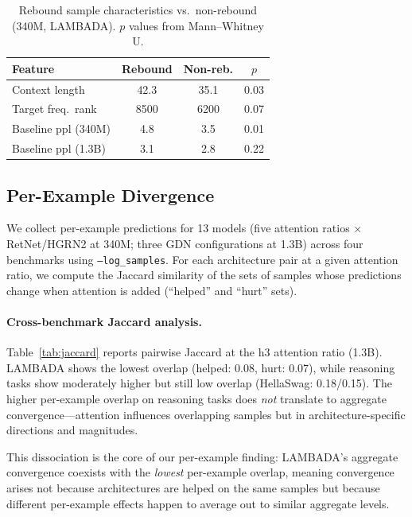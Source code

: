 \documentclass[11pt,twocolumn]{article}
\begin{document}
\begin{table}[t]
\centering
\small
\caption{Rebound sample characteristics vs.\ non-rebound (340M, LAMBADA). $p$ values from Mann--Whitney U.}\label{tab:rebound-chars}
\begin{tabular}{@{}lccc@{}}
\toprule
\textbf{Feature} & \textbf{Rebound} & \textbf{Non-reb.} & \textbf{$p$} \\
\midrule
Context length & 42.3 & 35.1 & 0.03 \\
Target freq.\ rank & 8500 & 6200 & 0.07 \\
Baseline ppl (340M) & 4.8 & 3.5 & 0.01 \\
Baseline ppl (1.3B) & 3.1 & 2.8 & 0.22 \\
\bottomrule
\end{tabular}
\end{table}


\subsection{Per-Example Divergence}\label{sec:per-example}

We collect per-example predictions for 13 models (five attention ratios $\times$ RetNet/HGRN2 at 340M; three GDN configurations at 1.3B) across four benchmarks using \texttt{--log\_samples}.
For each architecture pair at a given attention ratio, we compute the Jaccard similarity of the sets of samples whose predictions change when attention is added (``helped'' and ``hurt'' sets).

\paragraph{Cross-benchmark Jaccard analysis.}
Table~\ref{tab:jaccard} reports pairwise Jaccard at the h3 attention ratio (1.3B).
LAMBADA shows the lowest overlap (helped: 0.08, hurt: 0.07), while reasoning tasks show moderately higher but still low overlap (HellaSwag: 0.18/0.15).
The higher per-example overlap on reasoning tasks does \emph{not} translate to aggregate convergence---attention influences overlapping samples but in architecture-specific directions and magnitudes.

This dissociation is the core of our per-example finding: LAMBADA's aggregate convergence coexists with the \emph{lowest} per-example overlap, meaning convergence arises not because architectures are helped on the same samples but because different per-example effects happen to average out to similar aggregate levels.
\end{document}
